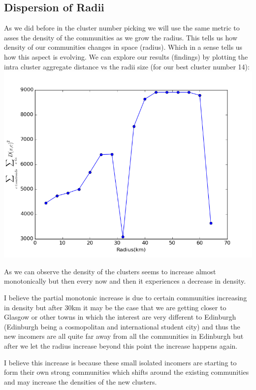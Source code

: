 \documentclass[10pt,twocolumn]{article}
\begin{document}
\subsection{Dispersion of Radii}

As we did before in the cluster number picking
we will use the same metric to asses the density
of the communities as we grow the radius. This tells us how density of our communities changes
in space (radius). Which in a sense tells us how this aspect is evolving.
\newline\newline
We can explore our results (findings) by plotting the intra cluster aggregate distance vs the radii size (for our best cluster number 14):
\includegraphics[scale=0.4]{pics/radii.png}

As we can observe the density of the clusters
seems to increase almost monotonically but then every now and then it experiences a decrease in density. 

I believe the partial monotonic increase is due to certain communities increasing  in density but after 30km it may be the case that we are getting closer to Glasgow or other towns in which the interest are very different to Edinburgh (Edinburgh being a cosmopolitan and international student city) and thus the new incomers are all quite far away from all the communities in Edinburgh but after we let the radius increase beyond this point the increase happens again.


I believe this increase is because these small isolated incomers are starting to form their own strong communities which shifts around the existing communities and may increase the densities of the new clusters.
\end{document}
